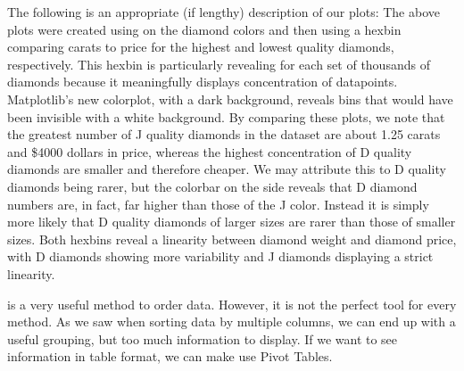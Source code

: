\begin{problem}

The following is an appropriate (if lengthy) description of our plots:
The above plots were created using  on the diamond colors and then using a hexbin comparing carats to price for the highest and lowest quality diamonds, respectively. 
This hexbin is particularly revealing for each set of thousands of diamonds because it meaningfully displays concentration of datapoints. 
Matplotlib's new  colorplot, with a dark background, reveals bins that would have been invisible with a white background.
By comparing these plots, we note that the greatest number of J quality diamonds in the dataset are about 1.25 carats and \$4000 dollars in price, whereas the highest concentration of D quality diamonds are smaller and therefore cheaper. 
We may attribute this to D quality diamonds being rarer, but the colorbar on the side reveals that D diamond numbers are, in fact, far higher than those of the J color. 
Instead it is simply more likely that D quality diamonds of larger sizes are rarer than those of smaller sizes. 
Both hexbins reveal a linearity between diamond weight and diamond price, with D diamonds showing more variability and J diamonds displaying a strict linearity.

\end{problem}

 is a very useful method to order data.  However, it is not the perfect tool for every method.  As we saw when sorting data by multiple columns, we can end up with a useful grouping, but too much information to display.  If we want to see information in table format, we can make use Pivot Tables.

